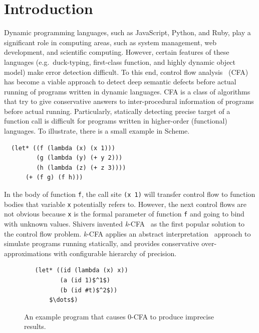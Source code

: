 \documentclass{article}
\begin{document}


\section{Introduction}
\label{Introduction}
Dynamic programming languages, such as JavaScript, Python, and Ruby, play a significant role in computing areas, such as system management, web development, and scientific computing.
However, certain features of these languages (e.g.\ duck-typing, first-class function, and highly dynamic object model) make error detection difficult.
To this end, control flow analysis~\cite{midtgaard2012control}
 (CFA) has become a viable approach to detect deep semantic defects before actual running of programs written in dynamic languages.
CFA is a class of algorithms that try to give conservative answers to inter-procedural information of programs before actual running.
Particularly, statically detecting precise target of a function call is difficult for programs written in higher-order (functional) languages.
To illustrate, there is a small example in Scheme.
\begin{lstlisting}
  (let* ((f (lambda (x) (x 1)))
         (g (lambda (y) (+ y 2)))
         (h (lambda (z) (+ z 3))))
      (+ (f g) (f h)))
\end{lstlisting}
In the body of function \verb|f|, the call site \verb|(x 1)| will transfer control flow to function bodies that variable \verb|x| potentially refers to.
However, the next control flows are not obvious because \verb|x| is the formal parameter of function \verb|f| and going to bind with unknown values.
Shivers invented \textit{k}-CFA~\cite{shivers1991control}
as the first popular solution to the control flow problem.
\textit{k}-CFA applies an abstract interpretation~\cite{cousot1977abstract}
 approach to simulate programs running statically, and provides conservative over-approximations with configurable hierarchy of precision.


 \begin{figure}
 \begin{lstlisting}
   (let* ((id (lambda (x) x))
          (a (id 1)$^1$)
          (b (id #t)$^2$))
       $\dots$)
 \end{lstlisting}
 \caption{An example program that causes 0-CFA to produce imprecise results.}
 \label{fig:eg1}
 \end{figure}
\end{document}
